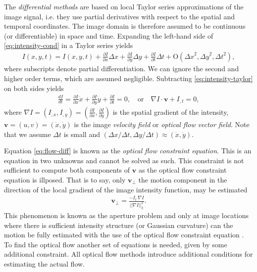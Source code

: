 \documentclass[letterpaper,12pt]{article}
\begin{document}
The \emph{differential methods} are based on local Taylor series approximations of the image signal, i.e. they use partial derivatives with respect to the spatial and temporal coordinates. The image domain is therefore assumed to be continuous (or differentiable) in space and time. Expanding the left-hand side of \eqref{eq:intensity-cond} in a Taylor series yields
\begin{align}
I(x,y,t) = I(x,y,t) +  \frac{\partial I}{\partial x} \Delta x + \frac{\partial I}{\partial y} \Delta y + \frac{\partial I}{\partial t} \Delta t + \textrm{O}({\Delta x}^2,{\Delta y}^2,{\Delta t}^2 ),
\label{eq:intensity-taylor}
\end{align}
where subscripts denote partial differentiation. We can ignore the second and higher order terms, which are assumed negligible. Subtracting \eqref{eq:intensity-taylor} on both sides yields 
\begin{align}
\frac{dI}{dt} = \frac{\partial I}{\partial x}  \dot{x} + \frac{\partial I}{\partial y} \dot{y} + \frac{\partial I}{\partial t} = 0, \quad \textrm{or}\quad  \nabla I \cdot \mathbf{v} + I_{,t} = 0,
\label{eq:flow-diff}
\end{align}
where $\nabla I = (I_{,x},I_{,y}) = (\frac{\partial I}{\partial x} ,\frac{\partial I}{\partial y} )$ is the spatial gradient of the intensity, $\mathbf{v} = (u,v) = (\dot{x},\dot{y})$ is the image \emph{velocity field} or \emph{optical flow vector field}. Note that we assume $\Delta t$ is small and $(\Delta x / \Delta t, \Delta y / \Delta t) \approx (\dot{x},\dot{y})$. 

Equation \eqref{eq:flow-diff} is known as the \emph{optical flow constraint equation}. This is an equation in two unknowns and cannot be solved as such. This constraint is not sufficient to
compute both components of $\mathbf{v}$ as the optical flow constraint equation is illposed.
That is to say, only $\mathbf{v_{\perp}}$ the motion component in the direction of the local gradient of the image intensity
function, may be estimated
\begin{align}
\mathbf{v_{\perp}} = \frac{- I_t ~\nabla I}{|| \nabla I ||_2^2}.
\label{eq:normal-v}
\end{align}
This phenomenon is known as the aperture problem and only at image
locations where there is sufficient intensity structure (or Gaussian curvature) can the motion be fully estimated with the use of the optical flow constraint equation \citep{Beauchemin:1995}. To find the optical flow another set of equations is needed, given by some additional constraint. All optical flow methods introduce additional conditions for estimating the actual flow.
\end{document}
